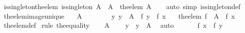 \begin{isabellebody}
%
\isadelimproof
\isanewline
%
\endisadelimproof
\isanewline
{}\isamarkupfalse%
\ is{\isacharunderscore}{\kern0pt}singleton{\isacharunderscore}{\kern0pt}the{\isacharunderscore}{\kern0pt}elem{\isacharcolon}{\kern0pt}\ {\isachardoublequoteopen}is{\isacharunderscore}{\kern0pt}singleton\ A\ {\isasymlongleftrightarrow}\ A\ {\isacharequal}{\kern0pt}\ {\isacharbraceleft}{\kern0pt}the{\isacharunderscore}{\kern0pt}elem\ A{\isacharbraceright}{\kern0pt}{\isachardoublequoteclose}\isanewline
%
\isadelimproof
\ \ %
\endisadelimproof
%
\isatagproof
{}\isamarkupfalse%
\ {\isacharparenleft}{\kern0pt}auto\ simp{\isacharcolon}{\kern0pt}\ is{\isacharunderscore}{\kern0pt}singleton{\isacharunderscore}{\kern0pt}def{\isacharparenright}{\kern0pt}%
\endisatagproof
{\isafoldproof}%
%
\isadelimproof
\isanewline
%
\endisadelimproof
\isanewline
{}\isamarkupfalse%
\ the{\isacharunderscore}{\kern0pt}elem{\isacharunderscore}{\kern0pt}image{\isacharunderscore}{\kern0pt}unique{\isacharcolon}{\kern0pt}\isanewline
\ \ \ {\isachardoublequoteopen}A\ {\isasymnoteq}\ {\isacharbraceleft}{\kern0pt}{\isacharbraceright}{\kern0pt}{\isachardoublequoteclose}\isanewline
\ \ \ \ \ {\isacharasterisk}{\kern0pt}{\isacharcolon}{\kern0pt}\ {\isachardoublequoteopen}{\isasymAnd}y{\isachardot}{\kern0pt}\ y\ {\isasymin}\ A\ {\isasymLongrightarrow}\ f\ y\ {\isacharequal}{\kern0pt}\ f\ x{\isachardoublequoteclose}\isanewline
\ \ \ {\isachardoublequoteopen}the{\isacharunderscore}{\kern0pt}elem\ {\isacharparenleft}{\kern0pt}f\ {\isacharbackquote}{\kern0pt}\ A{\isacharparenright}{\kern0pt}\ {\isacharequal}{\kern0pt}\ f\ x{\isachardoublequoteclose}\isanewline
%
\isadelimproof
\ \ %
\endisadelimproof
%
\isatagproof
{}\isamarkupfalse%
\ the{\isacharunderscore}{\kern0pt}elem{\isacharunderscore}{\kern0pt}def\isanewline
{}\isamarkupfalse%
\ {\isacharparenleft}{\kern0pt}rule\ the{}{\isacharunderscore}{\kern0pt}equality{\isacharparenright}{\kern0pt}\isanewline
\ \ \isamarkupfalse%
\ {\isacartoucheopen}A\ {\isasymnoteq}\ {\isacharbraceleft}{\kern0pt}{\isacharbraceright}{\kern0pt}{\isacartoucheclose}\ \isamarkupfalse%
\ y\ \ {\isachardoublequoteopen}y\ {\isasymin}\ A{\isachardoublequoteclose}\ \isamarkupfalse%
\ auto\isanewline
\ \ \isamarkupfalse%
\ {\isacharasterisk}{\kern0pt}\ \isamarkupfalse%
\ {\isachardoublequoteopen}f\ x\ {\isacharequal}{\kern0pt}\ f\ y{\isachardoublequoteclose}\ \isamarkupfalse%

\end{isabellebody}
